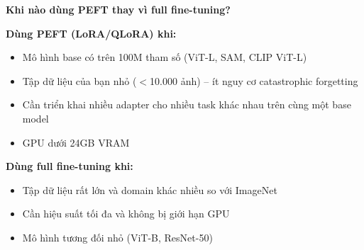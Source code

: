 \begin{mdframed}[style=infobox]
\textbf{Khi nào dùng PEFT thay vì full fine-tuning?}

\textbf{Dùng PEFT (LoRA/QLoRA) khi:}
\begin{itemize}
    \item Mô hình base có trên 100M tham số (ViT-L, SAM, CLIP ViT-L)
    \item Tập dữ liệu của bạn nhỏ ($<$10.000 ảnh) -- ít nguy cơ catastrophic forgetting
    \item Cần triển khai nhiều adapter cho nhiều task khác nhau trên cùng một base model
    \item GPU dưới 24GB VRAM
\end{itemize}

\textbf{Dùng full fine-tuning khi:}
\begin{itemize}
    \item Tập dữ liệu rất lớn và domain khác nhiều so với ImageNet
    \item Cần hiệu suất tối đa và không bị giới hạn GPU
    \item Mô hình tương đối nhỏ (ViT-B, ResNet-50)
\end{itemize}
\end{mdframed}
